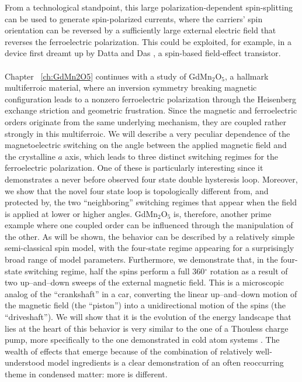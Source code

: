 From a technological standpoint, this large polarization-dependent spin-splitting can be used to generate spin-polarized currents, where the carriers' spin orientation can be reversed by a sufficiently large external electric field that reverses the ferroelectric polarization.
This could be exploited, for example, in a device first dreamt up by Datta and Das \cite{Datta1990}, a spin-based field-effect transistor.
\\\\
Chapter ~\ref{ch:GdMn2O5} continues with a study of GdMn$_2$O$_5$, a hallmark multiferroic material, where an inversion symmetry breaking magnetic configuration leads to a nonzero ferroelectric polarization through the Heisenberg exchange striction and geometric frustration.
Since the magnetic and ferroelectric orders originate from the same underlying mechanism, they are coupled rather strongly in this multiferroic.
We will describe a very peculiar dependence of the magnetoelectric switching on the angle between the applied magnetic field and the crystalline $a$ axis, which leads to three distinct switching regimes for the ferroelectric polarization.
One of these is particularly interesting since it demonstrates a never before observed four state double hysteresis loop.
Moreover, we show that the novel four state loop is topologically different from, and protected by, the two ``neighboring'' switching regimes that appear when the field is applied at lower or higher angles.
GdMn$_2$O$_5$ is, therefore, another prime example where one coupled order can be influenced through the manipulation of the other.
As will be shown, the behavior can be described by a relatively simple semi-classical spin model, with the four-state regime appearing for a surprisingly broad range of model parameters.
Furthermore, we demonstrate that, in the four-state switching regime, half the spins perform a full 360$^\circ$ rotation as a result of two up--and--down sweeps of the external magnetic field.
This is a microscopic analog of the ``crankshaft'' in a car, converting the linear up--and--down motion of the magnetic field (the ``piston'') into a unidirectional motion of the spins (the ``driveshaft'').
We will show that it is the evolution of the energy landscape that lies at the heart of this behavior is very similar to the one of a Thouless charge pump, more specifically to the one demonstrated in cold atom systems \cite{Lohse16}.
The wealth of effects that emerge because of the combination of relatively well-understood model ingredients is a clear demonstration of an often reoccurring theme in condensed matter: more is different.  
